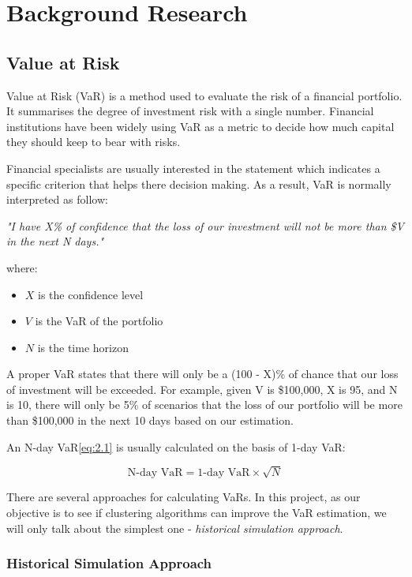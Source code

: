 \documentclass[11pt]{article} %
\theoremstyle{plain}
\theoremstyle{definition}
\begin{document}
\section{Background Research}
\subsection{Value at Risk}
Value at Risk (VaR) is a method used to evaluate the risk of a financial portfolio. It summarises the degree of investment risk with a single number. Financial institutions have been widely using VaR as a metric to decide how much capital they should keep to bear with risks.

Financial specialists are usually interested in the statement which indicates a specific criterion that helps there decision making. As a result, VaR is normally interpreted as follow:

\textit{"I have X\% of confidence that the loss of our investment will not be more than \$V in the next N days."}

{
  \footnotesize
  where:
  \begin{itemize}[label=-, leftmargin=4em, itemsep=0.1em]
    \item ${X}$ is the confidence level
    \item ${V}$ is the VaR of the portfolio
    \item ${N}$ is the time horizon
  \end{itemize}
}

A proper VaR states that there will only be a (100 - X)\% of chance that our loss of investment will be exceeded. For example, given V is \$100,000, X is 95, and N is 10, there will only be 5\% of scenarios that the loss of our portfolio will be more than \$100,000 in the next 10 days based on our estimation.

An N-day VaR\eqref{eq:2.1} is usually calculated on the basis of 1-day VaR:

\begin{equation}
  \label{eq:2.1}
  \tag{2.1}
  {\text{N-day VaR} = \text{1-day VaR} \times \sqrt{N}}
\end{equation}

There are several approaches for calculating VaRs. In this project, as our objective is to see if clustering algorithms can improve the VaR estimation, we will only talk about the simplest one - \textit{historical simulation approach}\cite{john/ofaod:2017}.

\subsubsection{Historical Simulation Approach}
\end{document}
